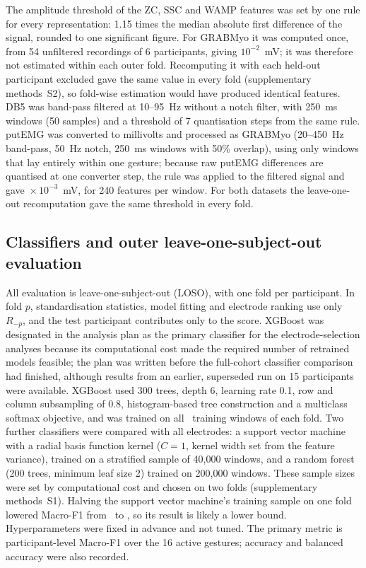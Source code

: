 The amplitude threshold of the ZC, SSC and WAMP features was set by one rule for every representation: 1.15 times the median absolute first difference of the signal, rounded to one significant figure. For GRABMyo it was computed once, from 54 unfiltered recordings of 6 participants, giving $10^{-2}$~mV; it was therefore not estimated within each outer fold. Recomputing it with each held-out participant excluded gave the same value in every fold (supplementary methods~S2), so fold-wise estimation would have produced identical features.
DB5 was band-pass filtered at 10--95~Hz without a notch filter, with 250~ms windows (50 samples) and a threshold of 7 quantisation steps from the same rule. putEMG was converted to millivolts and processed as GRABMyo (20--450~Hz band-pass, 50~Hz notch, 250~ms windows with 50\% overlap), using only windows that lay entirely within one gesture; because raw putEMG differences are quantised at one converter step, the rule was applied to the filtered signal and gave \PutThresh${}\times 10^{-3}$~mV, for 240 features per window. For both datasets the leave-one-out recomputation gave the same threshold in every fold.

\subsection{Classifiers and outer leave-one-subject-out evaluation}
All evaluation is leave-one-subject-out (LOSO), with one fold per participant. In fold $p$, standardisation statistics, model fitting and electrode ranking use only $R_{-p}$, and the test participant contributes only to the score. XGBoost was designated in the analysis plan as the primary classifier for the electrode-selection analyses because its computational cost made the required number of retrained models feasible; the plan was written before the full-cohort classifier comparison had finished, although results from an earlier, superseded run on 15 participants were available. XGBoost used 300 trees, depth 6, learning rate 0.1, row and column subsampling of 0.8, histogram-based tree construction and a multiclass softmax objective, and was trained on all \FoldTrainingWindows\ training windows of each fold. Two further classifiers were compared with all electrodes: a support vector machine with a radial basis function kernel ($C = 1$, kernel width set from the feature variance), trained on a stratified sample of 40,000 windows, and a random forest (200 trees, minimum leaf size 2) trained on 200,000 windows. These sample sizes were set by computational cost and chosen on two folds (supplementary methods~S1). Halving the support vector machine's training sample on one fold lowered Macro-F1 from \SVMCalibFortyK\ to \SVMCalibTwentyK, so its result is likely a lower bound. Hyperparameters were fixed in advance and not tuned. The primary metric is participant-level Macro-F1 over the 16 active gestures; accuracy and balanced accuracy were also recorded.

